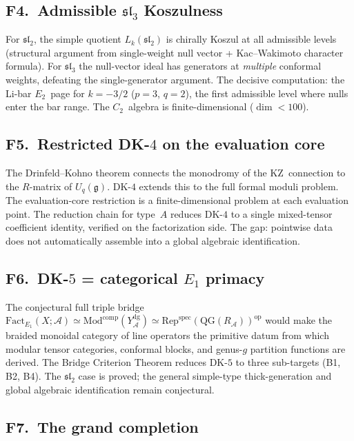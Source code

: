 \documentclass[11pt]{article}
\newcommand{\cA}{\mathcal{A}}
\newcommand{\fg}{\mathfrak{g}}
\begin{document}
\subsection{F4.\ Admissible $\mathfrak{sl}_3$ Koszulness}

For $\mathfrak{sl}_2$, the simple quotient $L_k(\mathfrak{sl}_2)$ is
chirally Koszul at all admissible levels (structural argument from
single-weight null vector + Kac--Wakimoto character formula).  For
$\mathfrak{sl}_3$ the null-vector ideal has generators at
\emph{multiple} conformal weights, defeating the single-generator
argument.  The decisive computation: the Li-bar $E_2$~page for
$k = -3/2$ ($p{=}3$, $q{=}2$), the first admissible level where
nulls enter the bar range.  The $C_2$~algebra is finite-dimensional
($\dim < 100$).

\subsection{F5.\ Restricted DK-$4$ on the evaluation core}

The Drinfeld--Kohno theorem connects the monodromy of the
KZ~connection to the $R$-matrix of $U_q(\fg)$.  DK-$4$ extends
this to the full formal moduli problem.  The evaluation-core
restriction is a finite-dimensional problem at each evaluation
point.  The reduction chain for type~$A$ reduces DK-$4$ to a
single mixed-tensor coefficient identity, verified on the
factorization side.  The gap: pointwise data does not automatically
assemble into a global algebraic identification.

\subsection{F6.\ DK-$5$ = categorical $E_1$ primacy}

The conjectural full triple bridge
$\mathrm{Fact}_{E_1}(X;\cA)
\simeq \mathrm{Mod}^{\mathrm{comp}}(Y^{\mathrm{dg}}_\cA)
\simeq \mathrm{Rep}^{\mathrm{spec}}(\mathrm{QG}(R_\cA))^{\mathrm{op}}$
would make the braided monoidal category of line operators the
primitive datum from which modular tensor categories, conformal
blocks, and genus-$g$ partition functions are derived.  The
Bridge Criterion Theorem reduces DK-$5$ to three sub-targets
(B1, B2, B4).  The $\mathfrak{sl}_2$ case is proved; the general
simple-type thick-generation and global algebraic identification
remain conjectural.

\subsection{F7.\ The grand completion}
\end{document}
